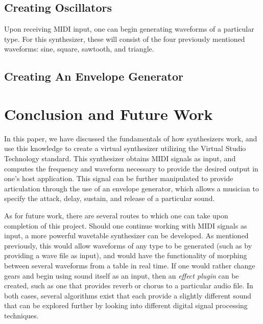 \documentclass[12pt]{article}
\begin{document}
\subsection{Creating Oscillators}
Upon receiving MIDI input, one can begin generating waveforms of a particular type. For this synthesizer, these will consist of the four previously mentioned waveforms: sine, square, sawtooth, and triangle. 

\subsection{Creating An Envelope Generator}

\newpage
\section{Conclusion and Future Work}
In this paper, we have discussed the fundamentals of how synthesizers work, and use this knowledge to create a virtual synthesizer utilizing the Virtual Studio Technology standard. This synthesizer obtains MIDI signals as input, and computes the frequency and waveform necessary to provide the desired output in one's host application. This signal can be further manipulated to provide articulation through the use of an envelope generator, which allows a musician to specify the attack, delay, sustain, and release of a particular sound.

As for future work, there are several routes to which one can take upon completion of this project. Should one continue working with MIDI signals as input, a more powerful wavetable synthesizer can be developed. As mentioned previously, this would allow waveforms of any type to be generated (such as by providing a wave file as input), and would have the functionality of morphing between several waveforms from a table in real time. If one would rather change gears and begin using sound itself as an input, then an \textit{effect plugin} can be created, such as one that provides reverb or chorus to a particular audio file. In both cases, several algorithms exist that each provide a slightly different sound that can be explored further by looking into different digital signal processing techniques.

\newpage


\end{document}
